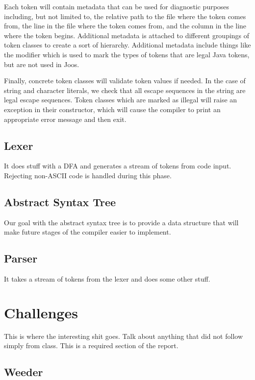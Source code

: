 \documentclass[pdftex,11pt,a4paper]{article}
\begin{document}
Each token will contain metadata that can be used for diagnostic
purposes including, but not limited to, the relative path to the file
where the token comes from, the line in the file where the token comes
from, and the column in the line where the token begins. Additional
metadata is attached to different groupings of token classes to create
a sort of hierarchy. Additional metadata include things like the
 modifier which is used to mark the types of tokens
that are legal Java tokens, but are not used in Joos.

Finally, concrete token classes will validate token values if
needed. In the case of string and character literals, we check that
all escape sequences in the string are legal escape sequences. Token
classes which are marked as illegal will raise an exception in their
constructor, which will cause the compiler to print an appropriate
error message and then exit.


\subsection{Lexer}

It does stuff with a DFA and generates a stream of tokens from code
input. Rejecting non-ASCII code is handled during this phase.


\subsection{Abstract Syntax Tree}

Our goal with the abstract syntax tree is to provide a data structure
that will make future stages of the compiler easier to implement.


\subsection{Parser}

It takes a stream of tokens from the lexer and does some other stuff.


\section{Challenges}


This is where the interesting shit goes. Talk about anything that did
not follow simply from class. This is a required section of the report.


\subsection{Weeder}
\end{document}
